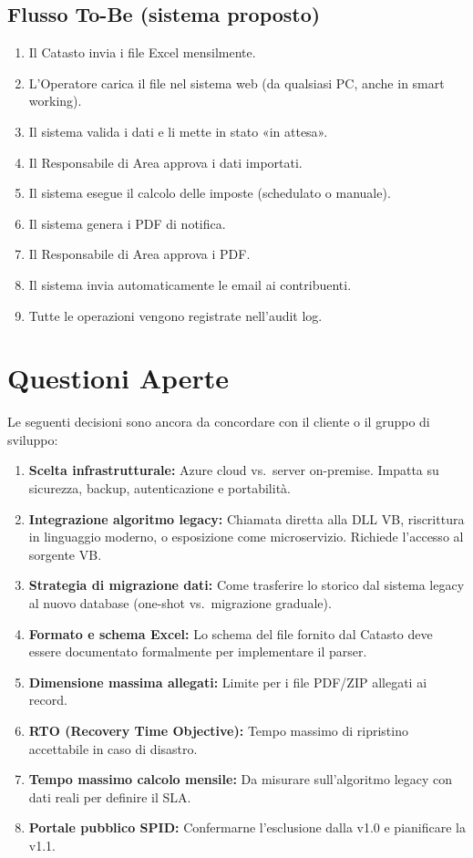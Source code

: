 \documentclass[12pt, a4paper]{article}
\begin{document}
\subsection{Flusso To-Be (sistema proposto)}

\begin{enumerate}
  \item Il Catasto invia i file Excel mensilmente.
  \item L'Operatore carica il file nel sistema web (da qualsiasi PC, anche in smart working).
  \item Il sistema valida i dati e li mette in stato «in attesa».
  \item Il Responsabile di Area approva i dati importati.
  \item Il sistema esegue il calcolo delle imposte (schedulato o manuale).
  \item Il sistema genera i PDF di notifica.
  \item Il Responsabile di Area approva i PDF.
  \item Il sistema invia automaticamente le email ai contribuenti.
  \item Tutte le operazioni vengono registrate nell'audit log.
\end{enumerate}

\section{Questioni Aperte}

Le seguenti decisioni sono ancora da concordare con il cliente o il gruppo di sviluppo:

\begin{enumerate}
  \item \textbf{Scelta infrastrutturale:} Azure cloud vs.\ server on-premise. Impatta su
        sicurezza, backup, autenticazione e portabilità.
  \item \textbf{Integrazione algoritmo legacy:} Chiamata diretta alla DLL VB, riscrittura
        in linguaggio moderno, o esposizione come microservizio. Richiede l'accesso al
        sorgente VB.
  \item \textbf{Strategia di migrazione dati:} Come trasferire lo storico dal sistema legacy
        al nuovo database (one-shot vs.\ migrazione graduale).
  \item \textbf{Formato e schema Excel:} Lo schema del file fornito dal Catasto deve essere
        documentato formalmente per implementare il parser.
  \item \textbf{Dimensione massima allegati:} Limite per i file PDF/ZIP allegati ai record.
  \item \textbf{RTO (Recovery Time Objective):} Tempo massimo di ripristino accettabile
        in caso di disastro.
  \item \textbf{Tempo massimo calcolo mensile:} Da misurare sull'algoritmo legacy con dati
        reali per definire il SLA.
  \item \textbf{Portale pubblico SPID:} Confermarne l'esclusione dalla v1.0 e pianificare
        la v1.1.
\end{enumerate}
\end{document}
